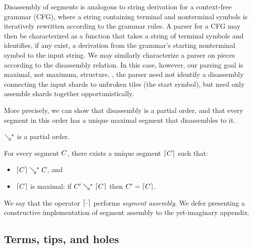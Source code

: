 Disassembly of segments is analogous to string derivation for a
context-free grammar (CFG),
where a string containing terminal and nonterminal symbols is iteratively
rewritten according to the grammar rules.
A parser for a CFG may then be characterized as a function
that takes a string of terminal symbols and identifies,
if any exist,
a derivation from the grammar's starting nonterminal
symbol to the input string.
We may similarly characterize a parser on pieces according
to the disassembly relation.
In this case, however, our parsing goal is maximal,
not maximum, structure, \ie, the parser
need not identify a disassembly connecting the input
shards to unbroken tiles (the start symbol), but need only assemble shards
together opportunistically.

More precisely, we can show that disassembly is a
partial order, and that every segment in this order
has a unique maximal segment that disassembles to it.
\begin{lemma}
  $\searrow^*$ is a partial order.
\end{lemma}
\begin{lemma}\label{lemma:unique-parsed-selection}
  For every segment $C$, there exists a unique
  segment $\left\lceil C\right\rceil$ such that:
  \begin{itemize}
  \item $\left\lceil C\right\rceil\searrow^*C$, and
  \item $\left\lceil C\right\rceil$ is maximal: if $C'\searrow^*\left\lceil C\right\rceil$ then $C' = \left\lceil C\right\rceil$.
  \end{itemize}
\end{lemma}
\noindent
We say that the operator $\left\lceil\cdot\right\rceil$ performs \emph{segment assembly}.
We defer presenting a constructive implementation of segment
assembly to the yet-imaginary appendix.



\subsection{Terms, tips, and holes} \label{sec:tips-and-terms}

